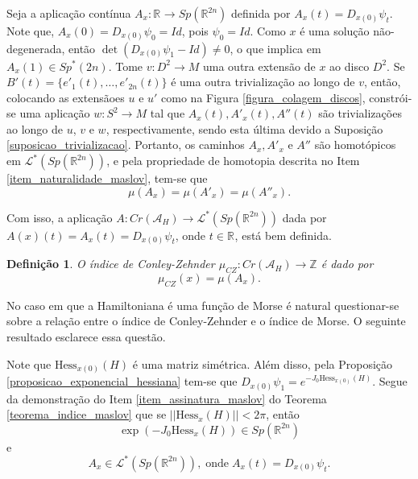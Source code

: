 \documentclass[12pt]{book}
\newtheorem{definicao}[teorema]{Definição}
\newcommand{\caminhosespeciais}[1]{\mathcal{L}^{*}(#1)}
\newcommand{\caminhos}{\mathcal{L}}
\newcommand{\dominioMaslov}{\caminhos^{*}(\gruposimpletico{\real{2n}})}
\newcommand{\estruturacomplexa}{J_{0}}
\newcommand{\funcionalH}{\mathcal{A}_{H}}
\newcommand{\gruposimpletico}[1]{Sp(#1)}
\newcommand{\gruposimpleticonaodegenerado}[1]{Sp^{#1}(2n)}
\newcommand{\hessianaponto}[2]{\text{Hess}_{#1}(#2)}
\newcommand{\iconley}[1]{\iconleyabrev(#1)}
\newcommand{\iconleyabrev}{\mu_{CZ}}
\newcommand{\inteiros}{\mathbb{Z}}
\newcommand{\norma}[1]{||#1||}
\newcommand{\pontoscriticos}[1]{\textit{Cr}(#1)}
\newcommand{\real}[1]{\mathbb{R}^{#1}}
\newcommand{\reta}{\real{}}
\begin{document}
	Seja a aplicação contínua $A_{x}:\reta \to \gruposimpletico{\real{2n}}$ definida por $A_{x}(t) = D_{x(0)}\psi_{t}$. Note que, $A_{x}(0) = D_{x(0)}\psi_{0}=Id$, pois $\psi_{0}=Id$. Como $x$ é uma solução não-degenerada, então $\det(D_{x(0)}\psi_{1}-Id) \neq 0$, o que implica em $A_{x}(1)\in \gruposimpleticonaodegenerado{*}$. Tome $v:D^{2}\to M$ uma outra extensão de $x$ ao disco $D^{2}$. Se $B'(t)= \{e'_{1}(t), \dots, e'_{2n}(t)\}$ é uma outra trivialização ao longo de $v$, então, colocando as extensãoes $u$ e $u'$ como na Figura \ref{figura_colagem_discos}, constrói-se uma aplicação $w:S^{2}\to M$ tal que $A_{x}(t), A'_{x}(t), A''(t)$ são trivializações ao longo de $u$, $v$ e $w$, respectivamente, sendo esta última devido a Suposição \ref{suposicao_trivializacao}. Portanto, os caminhos $A_{x}, A'_{x}$ e $ A''$ são homotópicos em $\dominioMaslov$, e pela propriedade de homotopia descrita no Item \ref{item_naturalidade_maslov}, tem-se que 
	$$
	\mu(A_{x}) = \mu(A'_{x}) = \mu(A''_{x}).
	$$

	Com isso, a aplicação $A: \pontoscriticos{\funcionalH} \to \caminhosespeciais{\gruposimpletico{\real{2n}}}$ dada por $A(x)(t) =A_{x}(t)= D_{x(0)}\psi_{t}$, onde $t \in \reta$, está bem definida.
	
	\begin{definicao}
		O índice de Conley-Zehnder $\iconleyabrev:\pontoscriticos{\funcionalH} \to \inteiros$ é dado por 
		$$
		\iconley{x} = \mu(A_{x}).
		$$
	\end{definicao}
	
	No caso em que a Hamiltoniana é uma função de Morse é natural questionar-se sobre a relação entre o índice de Conley-Zehnder e o índice de Morse. O seguinte resultado esclarece essa questão.
	
	Note que $\hessianaponto{x(0)}{H}$ é uma matriz simétrica. Além disso, pela Proposição \ref{proposicao_exponencial_hessiana} tem-se que $D_{x(0)}\psi_{1}= e^{-\estruturacomplexa \hessianaponto{x(0)}{H}}$. Segue da demonstração do Item \ref{item_assinatura_maslov} do Teorema \ref{teorema_indice_maslov} que se $\norma{\hessianaponto{x}{H}}<2\pi$, então 
	$$
	\exp(-\estruturacomplexa \hessianaponto{x}{H}) \in \gruposimpletico{\real{2n}}
	$$
	e
	$$ 
	A_{x}\in \caminhosespeciais{\gruposimpletico{\real{2n}}},\;\text{onde}\; A_{x}(t) = D_{x(0)}\psi_{t}.
	$$ 
	
\end{document}
